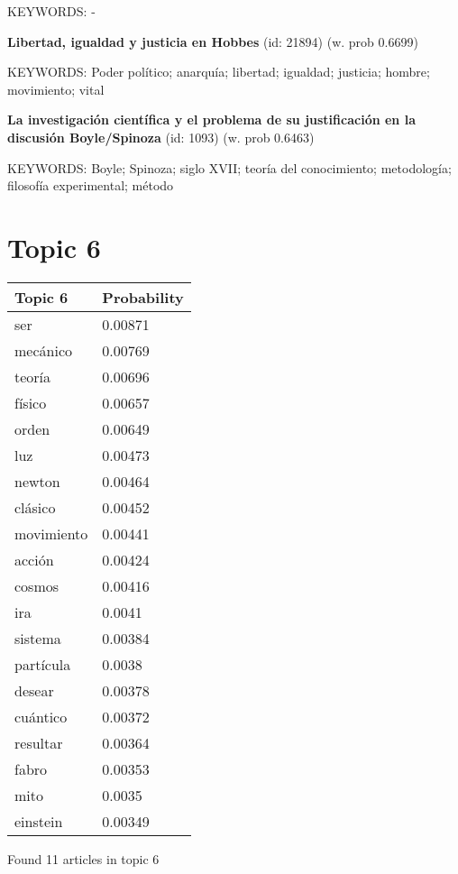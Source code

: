 \documentclass{article}
\begin{document}
KEYWORDS:
-
\vfill

\textbf{Libertad, igualdad y justicia en Hobbes} (id: 21894)
 (w. prob 0.6699)


KEYWORDS:
Poder político; anarquía; libertad; igualdad; justicia; hombre; movimiento; vital
\vfill

\textbf{La investigación científica y el problema de su justificación en la discusión Boyle/Spinoza} (id: 1093)
 (w. prob 0.6463)


KEYWORDS:
Boyle; Spinoza; siglo XVII; teoría del conocimiento; metodología; filosofía experimental; método

\vfill
\newpage


\centering
\thispagestyle{empty}
\section*{Topic 6}\vfill
\begin{tabular}{ll}
\toprule
    Topic 6 & Probability \\
\midrule
        ser &     0.00871 \\
   mecánico &     0.00769 \\
     teoría &     0.00696 \\
     físico &     0.00657 \\
      orden &     0.00649 \\
        luz &     0.00473 \\
     newton &     0.00464 \\
    clásico &     0.00452 \\
 movimiento &     0.00441 \\
     acción &     0.00424 \\
     cosmos &     0.00416 \\
        ira &      0.0041 \\
    sistema &     0.00384 \\
  partícula &      0.0038 \\
     desear &     0.00378 \\
   cuántico &     0.00372 \\
   resultar &     0.00364 \\
      fabro &     0.00353 \\
       mito &      0.0035 \\
   einstein &     0.00349 \\
\bottomrule
\end{tabular}

\vfill
Found 11 articles in topic 6
\vfill
\end{document}
